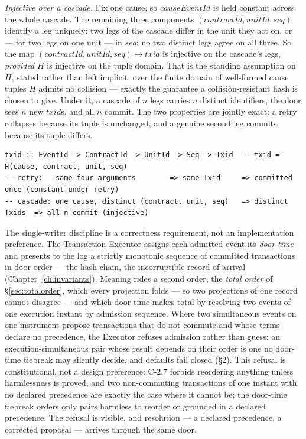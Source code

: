\documentclass[11pt,a4paper]{article}
\begin{document}
\emph{Injective over a cascade.} Fix one cause, so $\mathit{causeEventId}$ is held
constant across the whole cascade. The remaining three components
$(\mathit{contractId}, \mathit{unitId}, \mathit{seq})$ identify a leg uniquely: two
legs of the cascade differ in the unit they act on, or --- for two legs on one unit
--- in $\mathit{seq}$; no two distinct legs agree on all three. So the map
$(\mathit{contractId}, \mathit{unitId}, \mathit{seq}) \mapsto \mathit{txid}$ is
injective on the cascade's legs, \emph{provided} $H$ is injective on the tuple domain.
That is the standing assumption on $H$, stated rather than left implicit: over the
finite domain of well-formed cause tuples $H$ admits no collision --- exactly the
guarantee a collision-resistant hash is chosen to give. Under it, a cascade of $n$
legs carries $n$ distinct identifiers, the door sees $n$ new $\mathit{txid}$s, and all
$n$ commit. The two properties are jointly exact: a retry collapses because its tuple
is unchanged, and a genuine second leg commits because its tuple differs.

\begin{lstlisting}
txid :: EventId -> ContractId -> UnitId -> Seq -> Txid  -- txid = H(cause, contract, unit, seq)
-- retry:   same four arguments        => same Txid     => committed once (constant under retry)
-- cascade: one cause, distinct (contract, unit, seq)   => distinct Txids  => all n commit (injective)
\end{lstlisting}

The single-writer discipline is a correctness requirement, not an
implementation preference. The Transaction Executor assigns each admitted event its
\emph{door time} and presents to the log a strictly monotonic sequence of committed
transactions in door order --- the hash chain, the incorruptible record of arrival
(Chapter~\ref{ch:invariants}). Meaning rides a second order, the \emph{total order} of
\S\ref{sec:totalorder}, which every projection folds --- so two projections of one record
cannot disagree --- and which door time makes total by resolving two events of one execution
instant by admission sequence. Where two simultaneous events on one
instrument propose transactions that do not commute and whose terms declare no precedence,
the Executor refuses admission rather than guess: an execution-simultaneous pair whose result
depends on their order is one no door-time tiebreak may silently decide, and defaults fail
closed (\S2). This refusal is constitutional, not a design preference: C-2.7 forbids
reordering anything unless harmlessness is proved, and two non-commuting transactions of one
instant with no declared precedence are exactly the case where it cannot be; the door-time
tiebreak orders only pairs harmless to reorder or grounded in a declared precedence. The
refusal is visible, and resolution --- a declared precedence, a corrected proposal --- arrives
through the same door.
\end{document}
